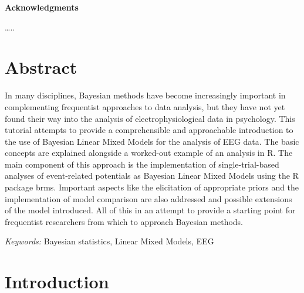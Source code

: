 \documentclass[
  doc,12pt,floatsintext]{apa7}
\begin{document}
\clearpage

\mbox{}\thispagestyle{empty}\clearpage

\newpage

\thispagestyle{empty}

\vspace*{55mm}

\begin{center}\textbf{Acknowledgments}\end{center}

\ldots..

\clearpage

\mbox{}\thispagestyle{empty}\clearpage

\thispagestyle{empty}

\vspace*{10mm}

\begin{flushleft}
{
\tableofcontents
}
\end{flushleft}

\newpage

\setcounter{page}{6}

\section*{Abstract}\label{abstract}

\noindent In many disciplines, Bayesian methods have become increasingly important in complementing frequentist approaches to data analysis, but they have not yet found their way into the analysis of electrophysiological data in psychology. This tutorial attempts to provide a comprehensible and approachable introduction to the use of Bayesian Linear Mixed Models for the analysis of EEG data. The basic concepts are explained alongside a worked-out example of an analysis in R. The main component of this approach is the implementation of single-trial-based analyses of event-related potentials as Bayesian Linear Mixed Models using the R package brms. Important aspects like the elicitation of appropriate priors and the implementation of model comparison are also addressed and possible extensions of the model introduced. All of this in an attempt to provide a starting point for frequentist researchers from which to approach Bayesian methods.

\emph{Keywords:} Bayesian statistics, Linear Mixed Models, EEG

\newpage

\section{Introduction}\label{introduction}
\end{document}
